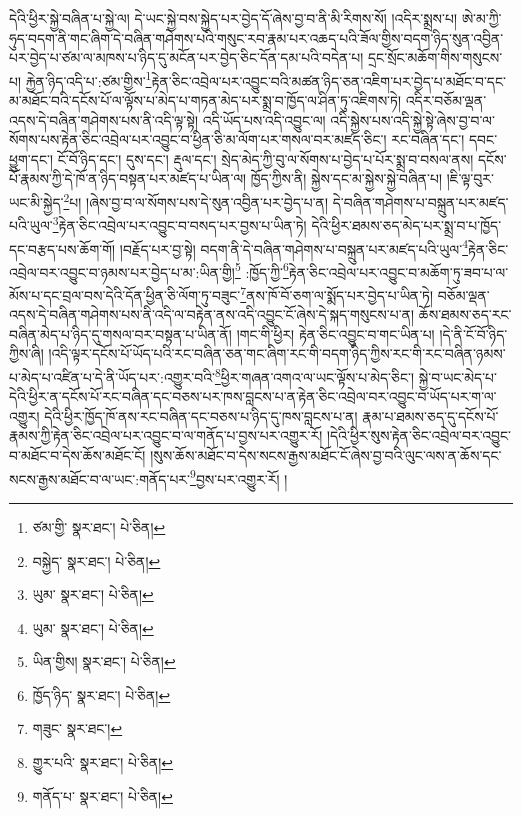 དེའི་ཕྱིར་སྐྱེ་བཞིན་པ་སྐྱེ་ལ། དེ་ཡང་སྐྱེ་བས་སྐྱེད་པར་བྱེད་དོ་ཞེས་བྱ་བ་ནི་མི་རིགས་སོ། །འདིར་སྨྲས་པ། ཨེ་མ་ཀྱི་ཧུད་བདག་ནི་གང་ཞིག་དེ་བཞིན་གཤེགས་པའི་གསུང་རབ་རྣམ་པར་འཆད་པའི་ཟོལ་གྱིས་བདག་ཉིད་སུན་འབྱིན་པར་བྱེད་པ་ཙམ་ལ་མཁས་པ་ཉིད་དུ་མངོན་པར་བྱེད་ཅིང་དོན་དམ་པའི་བདེན་པ། དྲང་སྲོང་མཆོག་གིས་གསུངས་པ། རྐྱེན་ཉིད་འདི་པ་:ཙམ་གྱིས་\footnote{ཙམ་གྱི་  སྣར་ཐང་།  པེ་ཅིན། }རྟེན་ཅིང་འབྲེལ་པར་འབྱུང་བའི་མཚན་ཉིད་ཅན་འཇིག་པར་བྱེད་པ་མཐོང་བ་དང་མ་མཐོང་བའི་དངོས་པོ་ལ་ལྟོས་པ་མེད་པ་གཏན་མེད་པར་སྨྲ་བ་ཁྱོད་ལ་ཤིན་ཏུ་འཇིགས་ཏེ། འདིར་བཅོམ་ལྡན་འདས་དེ་བཞིན་གཤེགས་པས་ནི་འདི་ལྟ་སྟེ། འདི་ཡོད་པས་འདི་འབྱུང་ལ། འདི་སྐྱེས་པས་འདི་སྐྱེ་སྟེ་ཞེས་བྱ་བ་ལ་སོགས་པས་རྟེན་ཅིང་འབྲེལ་པར་འབྱུང་བ་ཕྱིན་ཅི་མ་ལོག་པར་གསལ་བར་མཛད་ཅིང་། རང་བཞིན་དང་། དབང་ཕྱུག་དང་། ངོ་བོ་ཉིད་དང་། དུས་དང་། རྡུལ་དང་། སྲེད་མེད་ཀྱི་བུ་ལ་སོགས་པ་བྱེད་པ་པོར་སྨྲ་བ་བསལ་ནས། དངོས་པོ་རྣམས་ཀྱི་དེ་ཁོ་ན་ཉིད་བསྟན་པར་མཛད་པ་ཡིན་ལ། ཁྱོད་ཀྱིས་ནི། སྐྱེས་དང་མ་སྐྱེས་སྐྱེ་བཞིན་པ། །ཇི་ལྟ་བུར་ཡང་མི་སྐྱེད་\footnote{བསྐྱེད་  སྣར་ཐང་།  པེ་ཅིན། }པ། །ཞེས་བྱ་བ་ལ་སོགས་པས་དེ་སུན་འབྱིན་པར་བྱེད་པ་ན། དེ་བཞིན་གཤེགས་པ་བསྐྲུན་པར་མཛད་པའི་ཡུལ་\footnote{ཡུམ་  སྣར་ཐང་།  པེ་ཅིན། }རྟེན་ཅིང་འབྲེལ་པར་འབྱུང་བ་བསད་པར་བྱས་པ་ཡིན་ཏེ། དེའི་ཕྱིར་ཐམས་ཅད་མེད་པར་སྨྲ་བ་པ་ཁྱོད་དང་བརྩད་པས་ཆོག་གོ། །བརྗོད་པར་བྱ་སྟེ། བདག་ནི་དེ་བཞིན་གཤེགས་པ་བསྐྲུན་པར་མཛད་པའི་ཡུལ་\footnote{ཡུམ་  སྣར་ཐང་།  པེ་ཅིན། }རྟེན་ཅིང་འབྲེལ་བར་འབྱུང་བ་ཉམས་པར་བྱེད་པ་མ་:ཡིན་གྱི།\footnote{ཡིན་གྱིས།  སྣར་ཐང་།  པེ་ཅིན། } :ཁྱོད་ཀྱི་\footnote{ཁྱོད་ཉིད་  སྣར་ཐང་།  པེ་ཅིན། }རྟེན་ཅིང་འབྲེལ་པར་འབྱུང་བ་མཆོག་ཏུ་ཟབ་པ་ལ་མོས་པ་དང་བྲལ་བས་དེའི་དོན་ཕྱིན་ཅི་ལོག་ཏུ་བཟུང་\footnote{གཟུང་  སྣར་ཐང་། }ནས་ཁོ་བོ་ཅག་ལ་སྨོད་པར་བྱེད་པ་ཡིན་ཏེ། བཅོམ་ལྡན་འདས་དེ་བཞིན་གཤེགས་པས་ནི་འདི་ལ་བརྟེན་ནས་འདི་འབྱུང་ངོ་ཞེས་དེ་སྐད་གསུངས་པ་ན། ཆོས་ཐམས་ཅད་རང་བཞིན་མེད་པ་ཉིད་དུ་གསལ་བར་བསྟན་པ་ཡིན་ནོ། །གང་གི་ཕྱིར། རྟེན་ཅིང་འབྱུང་བ་གང་ཡིན་པ། །དེ་ནི་ངོ་བོ་ཉིད་ཀྱིས་ཞི། །འདི་ལྟར་དངོས་པོ་ཡོད་པའི་རང་བཞིན་ཅན་གང་ཞིག་རང་གི་བདག་ཉིད་ཀྱིས་རང་གི་རང་བཞིན་ཉམས་པ་མེད་པ་འཛིན་པ་དེ་ནི་ཡོད་པར་:འགྱུར་བའི་\footnote{གྱུར་པའི་  སྣར་ཐང་།  པེ་ཅིན། }ཕྱིར་གཞན་འགའ་ལ་ཡང་ལྟོས་པ་མེད་ཅིང་། སྐྱེ་བ་ཡང་མེད་པ་དེའི་ཕྱིར་ན་དངོས་པོ་རང་བཞིན་དང་བཅས་པར་ཁས་བླངས་པ་ན་རྟེན་ཅིང་འབྲེལ་བར་འབྱུང་བ་ཡོད་པར་ག་ལ་འགྱུར། དེའི་ཕྱིར་ཁྱོད་ཁོ་ནས་རང་བཞིན་དང་བཅས་པ་ཉིད་དུ་ཁས་བླངས་པ་ན། རྣམ་པ་ཐམས་ཅད་དུ་དངོས་པོ་རྣམས་ཀྱི་རྟེན་ཅིང་འབྲེལ་པར་འབྱུང་བ་ལ་གནོད་པ་བྱས་པར་འགྱུར་རོ། །དེའི་ཕྱིར་སུས་རྟེན་ཅིང་འབྲེལ་བར་འབྱུང་བ་མཐོང་བ་དེས་ཆོས་མཐོང་ངོ། །སུས་ཆོས་མཐོང་བ་དེས་སངས་རྒྱས་མཐོང་ངོ་ཞེས་བྱ་བའི་ལུང་ལས་ན་ཆོས་དང་སངས་རྒྱས་མཐོང་བ་ལ་ཡང་:གནོད་པར་\footnote{གནོད་པ་  སྣར་ཐང་།  པེ་ཅིན། }བྱས་པར་འགྱུར་རོ། །
